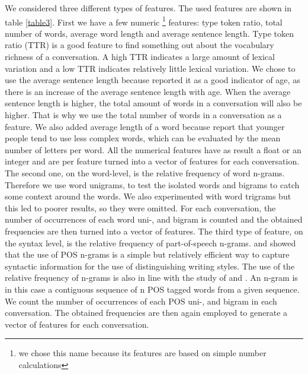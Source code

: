 \documentclass{clv3}
\begin{document}
We considered three different types of features. The used features are shown in table \ref{table3}. First we have a few numeric \footnote{we chose this name because its features are based on simple number calculations} features: type token ratio, total number of words, average word length and average sentence length. Type token ratio (TTR) is a good feature to find something out about the vocabulary richness of a conversation. A high TTR indicates a large amount of lexical variation and a low TTR indicates relatively little lexical variation. We chose to use the average sentence length because \citet{rustagi2009stylometric} reported it as a good indicator of age, as there is an increase of the average sentence length with age. When the average sentence length is higher, the total amount of words in a conversation will also be higher. That is why we use the total number of words in a conversation as a feature. We also added average length of a word because \citet{kocherdistance} report that younger people tend to use less complex words, which can be evaluated by the mean number of letters per word. All the numerical features have as result a float or an integer and are per feature turned into a vector of features for each conversation. The second one, on the word-level, is the relative frequency of word n-grams. Therefore we use word unigrams, to test the isolated words and bigrams to catch some context around the words. We also experimented with word trigrams but this led to poorer results, so they were omitted.  For each conversation, the number of occurrences of each word uni-, and bigram is counted and the obtained frequencies are then turned into a vector of features. The third type of feature, on the syntax level, is the relative frequency of part-of-speech n-grams. \citet{baayen1996outside,stamatatos2001computer} and \citet{koppel2002automatically} showed that the use of POS n-grams is a simple but relatively efficient way to capture syntactic information for the use of distinguishing writing styles. The use of the relative frequency of n-grams is also in line with the study of \citet{meina2013ensemble} and \citet{santosh2013author}. An n-gram is in this case a contiguous sequence of n POS tagged words from a given sequence. We count the number of occurrences of each POS uni-, and bigram in each conversation. The obtained frequencies are then again employed to generate a vector of features for each conversation. 
\end{document}
